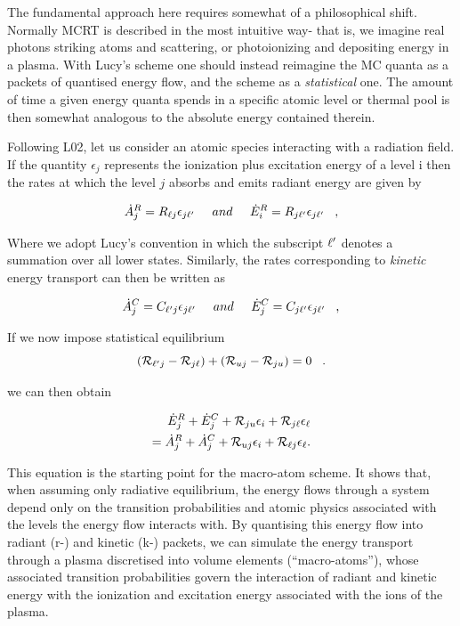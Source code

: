 The fundamental approach here requires somewhat of a philosophical shift.
Normally MCRT is described in the most intuitive way- that is, we imagine
real photons striking atoms and scattering, or photoionizing 
and depositing energy in a plasma. With Lucy's scheme one should instead 
reimagine the MC quanta as a packets of quantised energy flow, and the scheme as a 
{\em statistical} one. The amount of time a given energy quanta spends in a specific atomic
level or thermal pool is then somewhat analogous to the absolute energy 
contained therein.

Following L02, let us consider an atomic species interacting with a radiation field.
If the quantity $\epsilon_j$ represents the ionization plus excitation energy of 
a level i then the rates at which the level $j$ absorbs and emits radiant energy 
are given by

\begin{equation}
 \dot{A}_{j}^{R} = R_{\ell j} \epsilon_{j \ell^\prime} \;\;\;\;\; and \;\;\;
\;\;  \dot{E}_{i}^{R} = R_{j \ell^\prime} \epsilon_{j \ell^\prime} \;\;\; ,
\end{equation}

Where we adopt Lucy's convention in which the subscript $\ell^\prime$ denotes a summation over
all lower states.
Similarly, the rates corresponding to {\em kinetic} energy transport can then be written as

\begin{equation}
 \dot{A}_{j}^{C} = C_{\ell^\prime j} \epsilon_{j \ell^\prime} \;\;\;\;\; and
\;\;\;
\;\;  \dot{E}_{j}^{C} = C_{j \ell^\prime} \epsilon_{j \ell^\prime} \;\;\; ,
\end{equation}

If we now impose statistical equilibrium
%
\begin{equation}
 ({\cal R}_{\ell^\prime j}-{\cal R}_{j \ell})+({\cal R}_{uj}-{\cal R}_{ju})=0 \;\;\;.
\end{equation}
 
we can then obtain 

\begin{eqnarray}
 \dot{E}_{j}^{R}+\dot{E}_{j}^{C}+{\cal R}_{ju}\epsilon_{i}+
 {\cal R}_{j \ell}\epsilon_{\ell}  \nonumber \\  
 = \dot{A}_{j}^{R}+\dot{A}_{j}^{C}+{\cal R}_{uj} \epsilon_{i}
 +{\cal R}_{\ell j} \epsilon_{\ell}           .  
 \label{eq:matom_SE}     
\end{eqnarray}

This equation is the starting point for the macro-atom scheme. It shows 
that, when assuming only radiative equilibrium, the energy flows through
a system depend only on the transition probabilities and atomic physics
associated with the levels the energy flow interacts with.
By quantising this energy flow into radiant (r-) and kinetic (k-) packets, 
we can simulate the energy transport through
a plasma discretised into volume elements (``macro-atoms''),
whose associated transition probabilities govern the interaction 
of radiant and kinetic energy with the ionization and excitation energy associated 
with the ions of the plasma.

